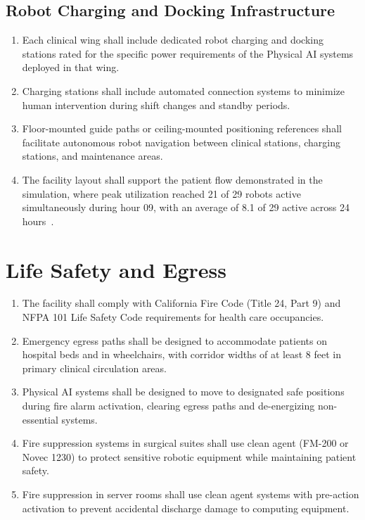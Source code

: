 \subsection{Robot Charging and Docking Infrastructure}

\begin{enumerate}[label=(\alph*)]
\item Each clinical wing shall include dedicated robot charging and docking
  stations rated for the specific power requirements of the Physical AI
  systems deployed in that wing.

\item Charging stations shall include automated connection systems to minimize
  human intervention during shift changes and standby periods.

\item Floor-mounted guide paths or ceiling-mounted positioning references shall
  facilitate autonomous robot navigation between clinical stations, charging
  stations, and maintenance areas.

\item The facility layout shall support the patient flow demonstrated in the
  simulation, where peak utilization reached 21 of 29 robots active
  simultaneously during hour 09, with an average of 8.1 of 29 active across
  24 hours~\cite{newtrial2026}.
\end{enumerate}

\section{Life Safety and Egress}

\begin{enumerate}[label=(\alph*)]
\item The facility shall comply with California Fire Code (Title 24, Part 9)
  and NFPA 101 Life Safety Code requirements for health care occupancies.

\item Emergency egress paths shall be designed to accommodate patients on
  hospital beds and in wheelchairs, with corridor widths of at least 8 feet
  in primary clinical circulation areas.

\item Physical AI systems shall be designed to move to designated safe positions
  during fire alarm activation, clearing egress paths and de-energizing
  non-essential systems.

\item Fire suppression systems in surgical suites shall use clean agent (FM-200
  or Novec 1230) to protect sensitive robotic equipment while maintaining
  patient safety.

\item Fire suppression in server rooms shall use clean agent systems with
  pre-action activation to prevent accidental discharge damage to computing
  equipment.
\end{enumerate}

